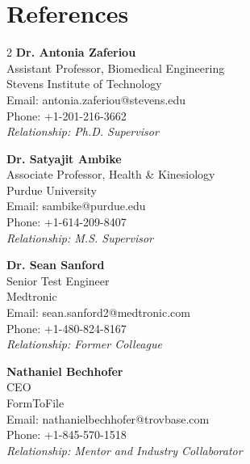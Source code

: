 \documentclass[a4paper,11pt]{article}
\begin{document}

\section{\textbf{References}}
\vspace{-0.2mm}
\small{
\begin{multicols}{2}
\raggedcolumns
\textbf{Dr. Antonia Zaferiou}\\
Assistant Professor, Biomedical Engineering\\
Stevens Institute of Technology\\
Email: antonia.zaferiou@stevens.edu\\
Phone: +1-201-216-3662\\
\textit{Relationship: Ph.D. Supervisor}

\vspace{5mm}

\textbf{Dr. Satyajit Ambike}\\
Associate Professor, Health \& Kinesiology\\
Purdue University\\
Email: sambike@purdue.edu\\
Phone: +1-614-209-8407\\
\textit{Relationship: M.S. Supervisor}

\columnbreak

\vspace{5mm}

\textbf{Dr. Sean Sanford}\\
Senior Test Engineer\\
Medtronic\\
Email: sean.sanford2@medtronic.com\\
Phone: +1-480-824-8167\\
\textit{Relationship: Former Colleague}

\vspace{5mm}

\textbf{Nathaniel Bechhofer}\\
CEO\\
FormToFile\\
Email: nathanielbechhofer@trovbase.com\\
Phone: +1-845-570-1518\\
\textit{Relationship: Mentor and Industry Collaborator}
\end{multicols}
}
\end{document}
